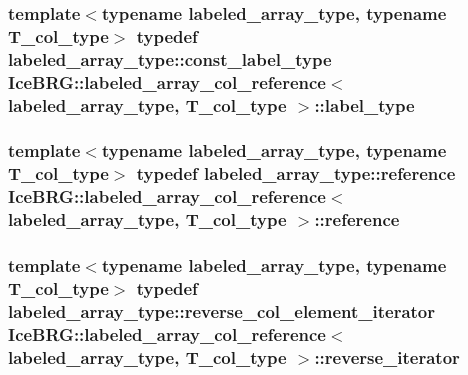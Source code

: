 \subsubsection[{label\+\_\+type}]{\setlength{\rightskip}{0pt plus 5cm}template$<$typename labeled\+\_\+array\+\_\+type, typename T\+\_\+col\+\_\+type$>$ typedef labeled\+\_\+array\+\_\+type\+::const\+\_\+label\+\_\+type {\bf Ice\+B\+R\+G\+::labeled\+\_\+array\+\_\+col\+\_\+reference}$<$ labeled\+\_\+array\+\_\+type, T\+\_\+col\+\_\+type $>$\+::{\bf label\+\_\+type}}\label{classIceBRG_1_1labeled__array__col__reference_a8dc48f0fd0cd4b9813289a8b6db0f9b6}
\hypertarget{classIceBRG_1_1labeled__array__col__reference_aab5b1a7515a3d5bb8e5ead3f3a8319f6}{}
\subsubsection[{reference}]{\setlength{\rightskip}{0pt plus 5cm}template$<$typename labeled\+\_\+array\+\_\+type, typename T\+\_\+col\+\_\+type$>$ typedef labeled\+\_\+array\+\_\+type\+::reference {\bf Ice\+B\+R\+G\+::labeled\+\_\+array\+\_\+col\+\_\+reference}$<$ labeled\+\_\+array\+\_\+type, T\+\_\+col\+\_\+type $>$\+::{\bf reference}}\label{classIceBRG_1_1labeled__array__col__reference_aab5b1a7515a3d5bb8e5ead3f3a8319f6}
\hypertarget{classIceBRG_1_1labeled__array__col__reference_af3dd2856e6301c59896b6219b2c3e3a1}{}
\subsubsection[{reverse\+\_\+iterator}]{\setlength{\rightskip}{0pt plus 5cm}template$<$typename labeled\+\_\+array\+\_\+type, typename T\+\_\+col\+\_\+type$>$ typedef labeled\+\_\+array\+\_\+type\+::reverse\+\_\+col\+\_\+element\+\_\+iterator {\bf Ice\+B\+R\+G\+::labeled\+\_\+array\+\_\+col\+\_\+reference}$<$ labeled\+\_\+array\+\_\+type, T\+\_\+col\+\_\+type $>$\+::{\bf reverse\+\_\+iterator}}\label{classIceBRG_1_1labeled__array__col__reference_af3dd2856e6301c59896b6219b2c3e3a1}
\hypertarget{classIceBRG_1_1labeled__array__col__reference_a5b8295af3ddffec129715ff6b7744b7e}{}
